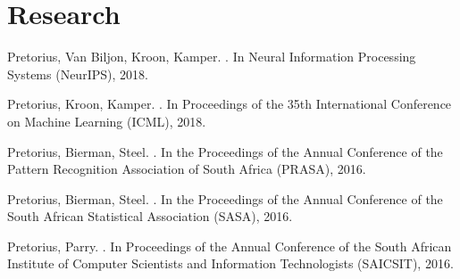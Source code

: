 \documentclass[]{deedy-resume-openfont}
\begin{document}
\begin{minipage}[t]{0.66\textwidth}


\section{Research}
\descript{}
\begin{tightemize}
\item Pretorius, Van Biljon, Kroon, Kamper. . In Neural Information Processing Systems (NeurIPS), 2018. \href{https://arxiv.org/pdf/1811.00293.pdf}{\custombold{[link]}}
\item Pretorius, Kroon, Kamper. . In Proceedings of the 35th International Conference on Machine Learning (ICML), 2018. \href{https://arxiv.org/pdf/1806.05413.pdf}{\custombold{[link]}}
\item Pretorius, Bierman, Steel. . In the Proceedings of the Annual Conference of the Pattern Recognition Association of South Africa (PRASA), 2016. \href{http://ieeexplore.ieee.org/abstract/document/7813171/?reload=true&lipi=urn:li:page:d_flagship3_profile_view_base;I751iNLxTn%2BqB3Q6oh5vBQ%3D%3D}{\custombold{[link]}}
\item Pretorius, Bierman, Steel. . In the Proceedings of the Annual Conference of the South African Statistical Association (SASA), 2016. \href{https://journals.co.za/content/sasj_proc/2016/con-1/EJC198852?lipi=urn%3Ali%3Apage%3Ad_flagship3_profile_view_base%3BI751iNLxTn%2BqB3Q6oh5vBQ%3D%3D#abstract_content}{\custombold{[link]}}
\item Pretorius, Parry. . In Proceedings of the Annual Conference of the South African Institute of Computer Scientists and Information Technologists (SAICSIT), 2016. \href{https://dl.acm.org/citation.cfm?id=2987493&lipi=urn%253Ali%253Apage%253Ad_flagship3_profile_view_base%253BI751iNLxTn%252BqB3Q6oh5vBQ%253D%253D}{\custombold{[link]}}
\end{tightemize}
\sectionsep


\end{minipage}
\end{document}
